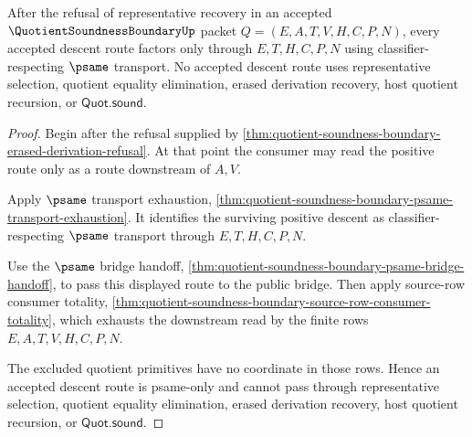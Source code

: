 \begin{theorem}
\label{thm:quotient-soundness-boundary-psame-only-descent}
After the refusal of representative recovery in an accepted $\QuotientSoundnessBoundaryUp$ packet $Q=(E,A,T,V,H,C,P,N)$, every accepted descent route factors only through $E,T,H,C,P,N$ using classifier-respecting $\psame$ transport. No accepted descent route uses representative selection, quotient equality elimination, erased derivation recovery, host quotient recursion, or $\mathsf{Quot.sound}$.
\end{theorem}
\begin{proof}
Begin after the refusal supplied by \autoref{thm:quotient-soundness-boundary-erased-derivation-refusal}. At that point the consumer may read the positive route only as a route downstream of $A,V$.

Apply $\psame$ transport exhaustion, \autoref{thm:quotient-soundness-boundary-psame-transport-exhaustion}. It identifies the surviving positive descent as classifier-respecting $\psame$ transport through $E,T,H,C,P,N$.

Use the $\psame$ bridge handoff, \autoref{thm:quotient-soundness-boundary-psame-bridge-handoff}, to pass this displayed route to the public bridge. Then apply source-row consumer totality, \autoref{thm:quotient-soundness-boundary-source-row-consumer-totality}, which exhausts the downstream read by the finite rows $E,A,T,V,H,C,P,N$.

The excluded quotient primitives have no coordinate in those rows. Hence an accepted descent route is psame-only and cannot pass through representative selection, quotient equality elimination, erased derivation recovery, host quotient recursion, or $\mathsf{Quot.sound}$.
\end{proof}

